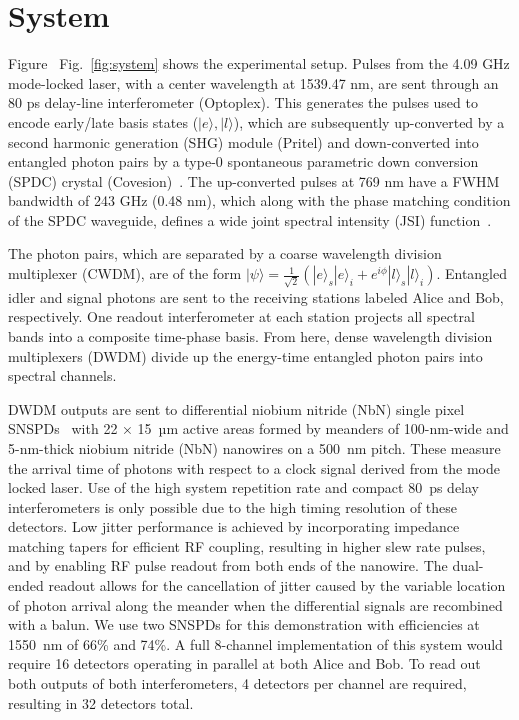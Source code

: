 \documentclass[11pt]{caltech_thesis} %
\begin{document}
\hypertarget{system}{%
\section{System}\label{system}}

Figure~ Fig.~\ref{fig:system} shows the experimental setup. Pulses from the 4.09 GHz mode-locked laser, with a center wavelength at 1539.47 nm, are sent through an 80 ps delay-line interferometer (Optoplex). This generates the pulses used to encode early/late basis states ($|e\rangle,|l\rangle$), which are subsequently up-converted by a second harmonic generation (SHG) module (Pritel) and down-converted into entangled photon pairs by a type-0 spontaneous parametric down conversion (SPDC) crystal (Covesion)~\autocite{Marcikic2002}. The up-converted pulses at 769 nm have a FWHM bandwidth of 243 GHz (0.48 nm), which along with the phase matching condition of the SPDC waveguide, defines a wide joint spectral intensity (JSI) function~\autocite{kim2005measurement}.

The photon pairs, which are separated by a coarse wavelength division multiplexer (CWDM), are of the form $|\psi\rangle=\frac{1}{\sqrt{2}}\left(|e\rangle_{s}|e\rangle_{i}+e^{i \phi}|l\rangle_{s}|l\rangle_{i}\right)$. Entangled idler and signal photons are sent to the receiving stations labeled Alice and Bob, respectively. One readout interferometer at each station projects all spectral bands into a composite time-phase basis. From here, dense wavelength division multiplexers (DWDM) divide up the energy-time entangled photon pairs into spectral channels.

DWDM outputs are sent to differential niobium nitride (NbN) single pixel SNSPDs~\autocite{Colangelo2023} with 22 × 15~µm active areas formed by meanders of 100-nm-wide and 5-nm-thick niobium nitride (NbN) nanowires on a 500~nm pitch. These measure the arrival time of photons with respect to a clock signal derived from the mode locked laser. Use of the high system repetition rate and compact 80~ps delay interferometers is only possible due to the high timing resolution of these detectors. Low jitter performance is achieved by incorporating impedance matching tapers for efficient RF coupling, resulting in higher slew rate pulses, and by enabling RF pulse readout from both ends of the nanowire. The dual-ended readout allows for the cancellation of jitter caused by the variable location of photon arrival along the meander when the differential signals are recombined with a balun. We use two SNSPDs for this demonstration with efficiencies at 1550~nm of 66\% and 74\%. A full 8-channel implementation of this system would require 16 detectors operating in parallel at both Alice and Bob. To read out both outputs of both interferometers, 4 detectors per channel are required, resulting in 32 detectors total.
\end{document}
